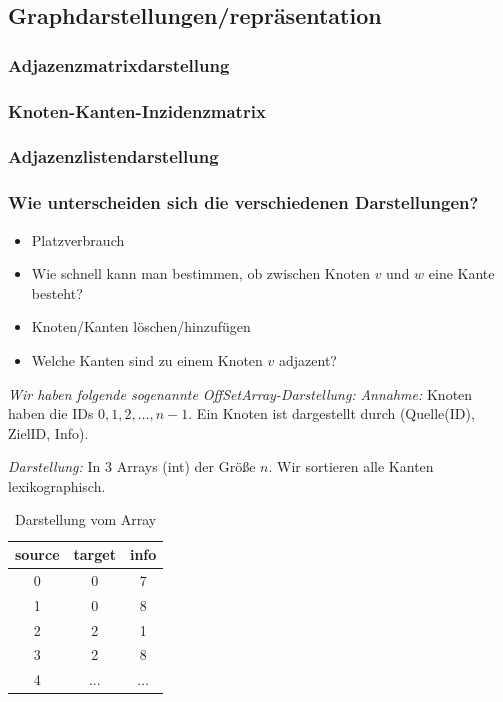 \documentclass{article}
\begin{document}
\subsection{Graphdarstellungen/repräsentation}

\subsubsection{Adjazenzmatrixdarstellung}
\subsubsection{Knoten-Kanten-Inzidenzmatrix}
\subsubsection{Adjazenzlistendarstellung}
\subsubsection{\textbf{Wie unterscheiden sich die verschiedenen Darstellungen?}}
\begin{itemize}
    \item Platzverbrauch
    \item Wie schnell kann man bestimmen, ob zwischen Knoten $v$ und $w$ eine Kante besteht?
    \item Knoten/Kanten löschen/hinzufügen
    \item Welche Kanten sind zu einem Knoten $v$ adjazent?
\end{itemize}

\textit{Wir haben folgende sogenannte OffSetArray-Darstellung:}  
\textit{Annahme:} Knoten haben die IDs $0, 1, 2, \dots, n-1$.  
Ein Knoten ist dargestellt durch (Quelle(ID), ZielID, Info).

\textit{Darstellung:} In 3 Arrays (int) der Größe $n$. Wir sortieren alle Kanten lexikographisch.

\begin{table}[]
\centering
\begin{tabular}{|c|c|c|}
    \hline
    source & target & info \\
    \hline
    0 & 0 & 7 \\
    1 & 0 & 8 \\
    2 & 2 & 1 \\
    3 & 2 & 8 \\
    4 & ... & ... \\
    \hline
\end{tabular}
\caption{Darstellung vom Array}
\label{tab:my_label}
\end{table}
\end{document}
